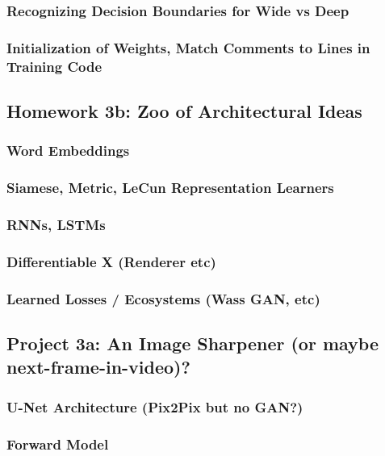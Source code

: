 \documentclass[12pt]{article}
\begin{document}
      \subsubsection*{Recognizing Decision Boundaries for Wide vs Deep}
      \subsubsection*{Initialization of Weights, Match Comments to Lines in Training Code}
    \newpage

    \subsection*{Homework 3b: Zoo of Architectural Ideas} %
      \subsubsection*{Word Embeddings}
      \subsubsection*{Siamese, Metric, LeCun Representation Learners}
      \subsubsection*{RNNs, LSTMs}
      \subsubsection*{Differentiable X (Renderer etc)}
      \subsubsection*{Learned Losses / Ecosystems (Wass GAN, etc)}
    \newpage

    \subsection*{Project 3a: An Image Sharpener (or maybe next-frame-in-video)?} %
      \subsubsection*{U-Net Architecture (Pix2Pix but no GAN?)}
      \subsubsection*{Forward Model}
\end{document}
